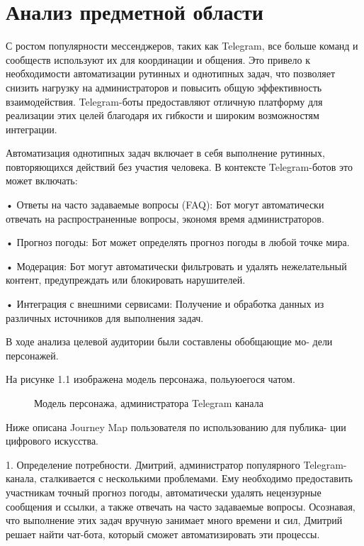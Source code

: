 \newsection
\section{Анализ предметной области}

С ростом популярности мессенджеров, таких как Telegram, все больше команд и сообществ используют их для координации и общения. Это привело к необходимости автоматизации рутинных и однотипных задач, что позволяет снизить нагрузку на администраторов и повысить общую эффективность взаимодействия. Telegram-боты предоставляют отличную платформу для реализации этих целей благодаря их гибкости и широким возможностям интеграции.

Автоматизация однотипных задач включает в себя выполнение рутинных, повторяющихся действий без участия человека. В контексте Telegram-ботов это может включать:

•	Ответы на часто задаваемые вопросы (FAQ): Бот могут автоматически отвечать на распространенные вопросы, экономя время администраторов.

•	Прогноз погоды: Бот может определять прогноз погоды в любой точке мира.

•	Модерация: Бот могут автоматически фильтровать и удалять нежелательный контент, предупреждать или блокировать нарушителей.

•	Интеграция с внешними сервисами: Получение и обработка данных из различных источников для выполнения задач.

В ходе анализа целевой аудитории были составлены обобщающие мо- дели персонажей.

На рисунке 1.1 изображена модель персонажа, польуюегося чатом.

\begin{figure}
	\center{\texttt{[image: un2]}}
	\caption{Модель персонажа, администратора Telegram канала}
	\label{un2:image}
\end{figure}

Ниже описана Journey Map пользователя по использованию для публика- ции цифрового искусства.

1.	Определение потребности. Дмитрий, администратор популярного Telegram-канала, сталкивается с несколькими проблемами. Ему необходимо предоставить участникам точный прогноз погоды, автоматически удалять нецензурные сообщения и ссылки, а также отвечать на часто задаваемые вопросы. Осознавая, что выполнение этих задач вручную занимает много времени и сил, Дмитрий решает найти чат-бота, который сможет автоматизировать эти процессы.

